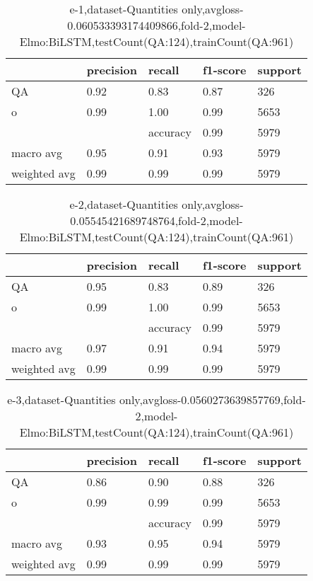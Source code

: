 \begin{table}[!ht] 
\centering
\caption{e-1,dataset-Quantities only,avgloss-0.060533393174409866,fold-2,model-Elmo:BiLSTM,testCount(QA:124),trainCount(QA:961)}\label{e-1data-quantS.tsv}
\begin{tabularx}{300pt}{|X|X|X|X|X|}
\hline
&precision&recall&f1-score&support\\
\hline
QA&0.92&0.83&0.87&326\\
\hline
o&0.99&1.00&0.99&5653\\
\hline
&&accuracy&0.99&5979\\
\hline
macro avg&0.95&0.91&0.93&5979\\
\hline
weighted avg&0.99&0.99&0.99&5979\\
\hline
\end{tabularx}
\end{table}
\begin{table}[!ht] 
\centering
\caption{e-2,dataset-Quantities only,avgloss-0.05545421689748764,fold-2,model-Elmo:BiLSTM,testCount(QA:124),trainCount(QA:961)}\label{e-2data-quantS.tsv}
\begin{tabularx}{300pt}{|X|X|X|X|X|}
\hline
&precision&recall&f1-score&support\\
\hline
QA&0.95&0.83&0.89&326\\
\hline
o&0.99&1.00&0.99&5653\\
\hline
&&accuracy&0.99&5979\\
\hline
macro avg&0.97&0.91&0.94&5979\\
\hline
weighted avg&0.99&0.99&0.99&5979\\
\hline
\end{tabularx}
\end{table}
\begin{table}[!ht] 
\centering
\caption{e-3,dataset-Quantities only,avgloss-0.0560273639857769,fold-2,model-Elmo:BiLSTM,testCount(QA:124),trainCount(QA:961)}\label{e-3data-quantS.tsv}
\begin{tabularx}{300pt}{|X|X|X|X|X|}
\hline
&precision&recall&f1-score&support\\
\hline
QA&0.86&0.90&0.88&326\\
\hline
o&0.99&0.99&0.99&5653\\
\hline
&&accuracy&0.99&5979\\
\hline
macro avg&0.93&0.95&0.94&5979\\
\hline
weighted avg&0.99&0.99&0.99&5979\\
\hline
\end{tabularx}
\end{table}
